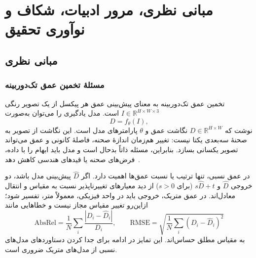 \chapter{مبانی نظری، مرور ادبیات، شکاف و نوآوری تحقیق}
\label{ch:literature}

\section{مبانی نظری}
\label{sec:ch2_foundations}

\subsection{مسئلهٔ تخمین عمق تک‌دوربینه}
تخمین عمق تک‌دوربینه به معنای پیش‌بینی عمق هر پیکسل از یک تصویر رنگی $I\in\mathbb{R}^{H\times W\times3}$ است. مدل یادگیری را می‌توان به‌صورت
\begin{equation}
 D=f_{\theta}(I),
\end{equation}
نوشت که $D\in\mathbb{R}^{H\times W}$ نگاشت عمق و $\theta$ پارامترهای مدل است. این نگاشت از تصویر به صحنهٔ سه‌بعدی یکتا نیست: تغییر هم‌زمان اندازهٔ صحنه، فاصلهٔ کانونی و عمق می‌تواند تصویر یکسانی بسازد. بنابراین، مسئله ذاتاً بدحال است و مدل باید ابهام را با داده، فرض‌های صحنه یا قیدهای هندسی کاهش دهد~\cite{HartleyZisserman2004,Eigen2014Depth}.

در عمق نسبی، تنها ترتیب یا نسبت عمق‌ها اهمیت دارد. اگر $\hat D$ پیش‌بینی مدل باشد، دو خروجی $\hat D$ و $s\hat D+t$ (برای $s>0$) از دید معیارهای تغییرناپذیر نسبت به مقیاس و انتقال معادل‌اند. در عمق متریک، خروجی باید در واحد فیزیکی، معمولاً متر، تفسیر شود؛ ازاین‌رو تغییر مقیاس مجاز نیست و خطاهایی مانند
\begin{equation}
 \mathrm{AbsRel}=\frac{1}{N}\sum_i\frac{|D_i-\hat D_i|}{D_i},\qquad
 \mathrm{RMSE}=\sqrt{\frac{1}{N}\sum_i(D_i-\hat D_i)^2}
\end{equation}
به مقیاس مطلق حساس‌اند. این تمایز در ادامه برای جدا کردن دستاوردهای مدل‌های نسبی از مدل‌های متریک ضروری است.

